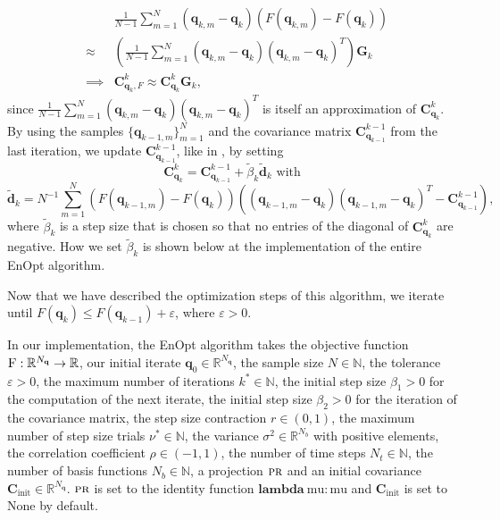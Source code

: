 \begin{eqnarray*}
&&\frac{1}{N-1}\sum_{m=1}^N(\mathbf{q}_{k,m}-\mathbf{q}_k)(F(\mathbf{q}_{k,m})-F(\mathbf{q}_k))\\
&\approx&\left(\frac{1}{N-1}\sum_{m=1}^N(\mathbf{q}_{k,m}-\mathbf{q}_k)(\mathbf{q}_{k,m}-\mathbf{q}_k)^T\right)\mathbf{G}_k\\
&\implies&\mathbf{C}_{\mathbf{q}_k,F}^k\approx\mathbf{C}_{\mathbf{q}_k}^k\mathbf{G}_k,
\end{eqnarray*}
since $\frac{1}{N-1}\sum_{m=1}^N(\mathbf{q}_{k,m}-\mathbf{q}_k)(\mathbf{q}_{k,m}-\mathbf{q}_k)^T$ is itself an approximation of $\mathbf{C}_{\mathbf{q}_k}^k$.\\

By using the samples $\{\mathbf{q}_{k-1,m}\}_{m=1}^N$ and the covariance matrix $\mathbf{C}_{\mathbf{q}_{k-1}}^{k-1}$ from the last iteration, we update $\mathbf{C}_{\mathbf{q}_{k-1}}^{k-1}$, like in \cite{Stordal2016-cj}, by setting
\begin{equation}
\label{updateCov}
\mathbf{C}_{\mathbf{q}_{k}}^{k}=\mathbf{C}_{\mathbf{q}_{k-1}}^{k-1}+\tilde{\beta}_k\tilde{\mathbf{d}}_k\text{ with}
\end{equation}
\begin{equation}
\label{updateCovDirection}
\tilde{\mathbf{d}}_k=N^{-1}\sum_{m=1}^N(F(\mathbf{q}_{k-1,m})-F(\mathbf{q}_k))((\mathbf{q}_{k-1,m}-\mathbf{q}_k)(\mathbf{q}_{k-1,m}-\mathbf{q}_k)^T-\mathbf{C}_{\mathbf{q}_{k-1}}^{k-1}),
\end{equation}
where $\tilde{\beta}_k$ is a step size that is chosen so that no entries of the diagonal of $\mathbf{C}_{\mathbf{q}_{k}}^{k}$ are negative. How we set $\tilde{\beta}_k$ is shown below at the implementation of the entire EnOpt algorithm.

Now that we have described the optimization steps of this algorithm, we iterate until $F(\mathbf{q}_k)\leq F(\mathbf{q}_{k-1})+\varepsilon$, where $\varepsilon>0$.

In our implementation, the EnOpt algorithm takes the objective function $\textproc{F}:\mathbb{R}^{N_\mathbf{q}}\to\mathbb{R}$, our initial iterate $\mathbf{q}_0\in\mathbb{R}^{N_\mathbf{q}}$, the sample size $N\in\mathbb{N}$, the tolerance $\varepsilon>0$, the maximum number of iterations $k^*\in\mathbb{N}$, the initial step size $\beta_1>0$ for the computation of the next iterate, the initial step size $\beta_2>0$ for the iteration of the covariance matrix, the step size contraction $r\in(0,1)$, the maximum number of step size trials $\nu^*\in\mathbb{N}$, the variance $\sigma^2\in\mathbb{R}^{N_b}$ with positive elements, the correlation coefficient $\rho\in(-1,1)$, the number of time steps $N_t\in\mathbb{N}$, the number of basis functions $N_b\in\mathbb{N}$, a projection $\textproc{pr}$ and an initial covariance $\mathbf{C}_\mathrm{init}\in\mathbb{R}^{N_\mathbf{q}}$. $\textproc{pr}$ is set to the identity function $\mathbf{lambda}\:\mathrm{mu}: \mathrm{mu}$ and $\mathbf{C}_\mathrm{init}$ is set to $\mathrm{None}$ by default.

